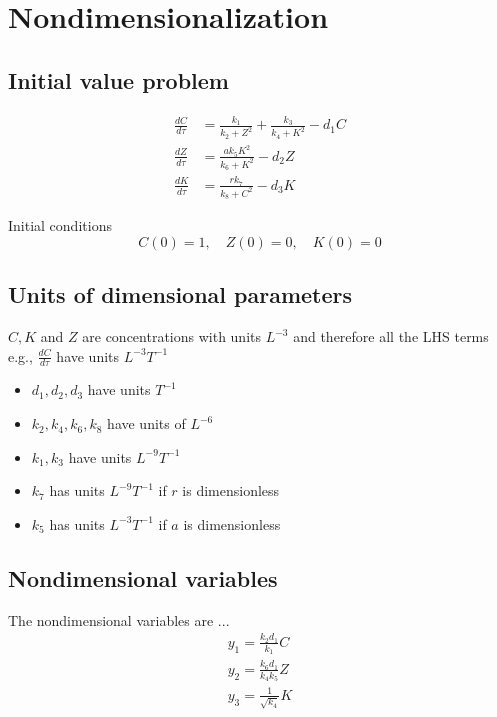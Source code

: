 \documentclass[10pt,letterpaper]{article}
\begin{document}

\section{Nondimensionalization}

\subsection{Initial value problem}

\begin{equation}
\begin{aligned}
\frac{dC}{d\tau} &= \frac{k_1}{k_2 + Z^2} + \frac{k_3}{k_4 + K^2} - d_1 C \\
\frac{dZ}{d\tau} &= \frac{a k_5 K^2}{k_6 + K^2} - d_2 Z \\
\frac{dK}{d\tau} &= \frac{r k_7}{k_8 + C^2} - d_3 K
\end{aligned}
\end{equation}

Initial conditions
\begin{equation}
C(0) = 1, \quad Z(0) = 0, \quad K(0) = 0
\end{equation}



\subsection{Units of dimensional parameters}

$C, K$ and $Z$ are concentrations with units $L^{-3}$ and therefore all the LHS terms e.g., $\frac{dC}{d\tau}$ have units $L^{-3}T^{-1}$

\begin{itemize}
  \item $d_1, d_2, d_3$ have units $T^{-1}$
  \item $k_2, k_4, k_6, k_8$ have units of $L^{-6}$ %
  \item $k_1, k_3$ have units $L^{-9} T^{-1}$
  \item $k_7$ has units $L^{-9} T^{-1}$ if $r$ is dimensionless
  \item $k_5$ has units $L^{-3}T^{-1}$  if $a$ is dimensionless
\end{itemize}


\subsection{Nondimensional variables}
The nondimensional variables are ...
\begin{equation}
\begin{aligned}
y_1 = \frac{k_2 d_1}{k_1} C \\
y_2 = \frac{k_6 d_1}{k_4 k_5} Z \\
y_3 = \frac{1}{\sqrt{k_4}} K \\
\end{aligned}
\end{equation}
\end{document}
